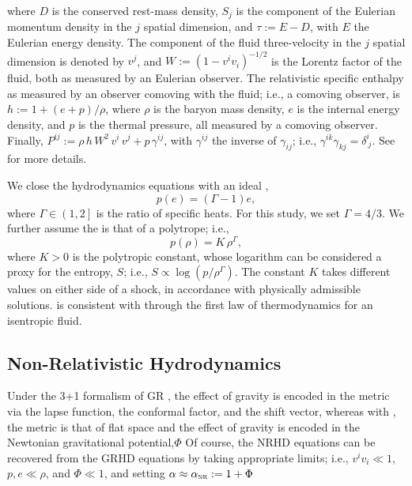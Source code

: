 where $D$ is the conserved rest-mass density,
$S_{j}$ is the component
of the Eulerian momentum density in the $j$\th{} spatial dimension,
and $\tau:=E-D$, with $E$ the Eulerian energy density.
The component of the fluid three-velocity in the $j$\th{} spatial dimension
is denoted by $v^{j}$, and
$W:=\left(1-v^{i}v_{i}\right)^{-1/2}$ is the Lorentz factor
of the fluid, both as measured by an Eulerian observer.
The relativistic specific enthalpy as measured by an observer
comoving with the fluid; i.e., a comoving observer, is
$h:=1+\left(e+p\right)/\rho$, where
$\rho$ is the baryon mass density, $e$ is the internal energy density,
and $p$ is the thermal pressure, all measured by a comoving observer.
Finally, $P^{ij}:=\rho\,h\,W^{2}\,v^{i}\,v^{j}+p\,\gamma^{ij}$,
with $\gamma^{ij}$ the inverse of $\gamma_{ij}$; i.e.,
$\gamma^{ik}\gamma_{kj}=\delta^{i}_{~j}$.
See \citet{rz2013} for more details.

We close the hydrodynamics equations
with an ideal \eos,
\begin{equation}
  p\left(e\right)=\left(\Gamma-1\right)e,
  \label{eq.idealEOS}
\end{equation}
where $\Gamma\in\left(1,2\right]$ is the ratio of specific heats.
For this study, we set $\Gamma=4/3$.
We further assume the \eos{} is that of a polytrope; i.e.,
\begin{equation}
  p\left(\rho\right)=K\,\rho^{\Gamma},
  \label{eq.polytrope}
\end{equation}
where $K>0$ is the polytropic constant,
whose logarithm can be considered a proxy for the entropy, $S$;
i.e., $S\propto\log\left(p/\rho^{\Gamma}\right)$.
The constant $K$ takes different values on either side of a
shock, in accordance with physically admissible solutions.
 is consistent with 
through the first law of thermodynamics for an isentropic fluid.

\subsection{Non-Relativistic Hydrodynamics}

Under the 3+1 formalism of GR ,
the effect of gravity is encoded in the metric via the lapse function,
the conformal factor, and the shift vector, whereas with
,
the metric is that of flat space and the effect of gravity
is encoded in the Newtonian gravitational potential,$\Phi$
Of course, the NRHD equations can be recovered from the GRHD equations
by taking appropriate limits; i.e.,
$v^{i}v_{i}\ll1$, $p,e\ll\rho$,
and $\Phi\ll1$, and setting $\alpha\approx\alpha_{\textsc{nr}}:=1+\Phi$

